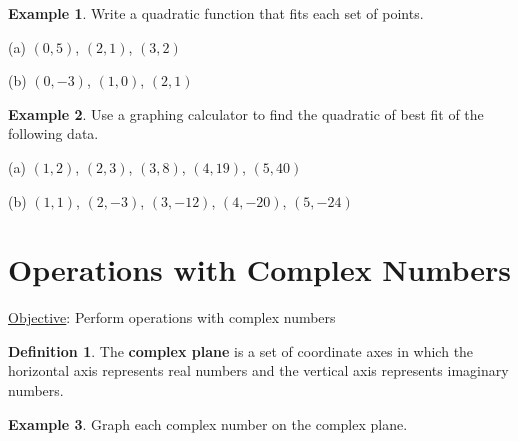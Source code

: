 \documentclass{report}
\theoremstyle{definition}
\newtheorem{example}{\bf Example}
\newtheorem{definition}{\bf Definition}[section]
\begin{document}
\begin{example}
Write a quadratic function that fits each set of points.
\end{example}

\begin{minipage}[t]{0.45\linewidth}
(a)  $(0,5)$, $(2,1)$, $(3,2)$


\end{minipage}
\hfill
\begin{minipage}[t]{0.45\linewidth}
(b) $(0,-3)$, $(1,0)$, $(2,1)$

\end{minipage}

\vfill

\begin{example}
Use a graphing calculator to find the quadratic of best fit of the following data.
\end{example}


\begin{minipage}[t]{0.45\linewidth}
(a)  $(1,2)$, $(2,3)$, $(3, 8)$, $(4,19)$, $(5, 40)$ 
\end{minipage}
\hfill
\begin{minipage}[t]{0.45\linewidth}
(b) $(1,1)$, $(2,-3)$, $(3,-12)$, $(4, -20)$, $(5,-24)$
\end{minipage}

\begin{minipage}[t]{0.45\linewidth}

\end{minipage}
\hfill
\begin{minipage}[t]{0.45\linewidth}

\end{minipage}

\vfill
\vfill
 \noindent{}
 \newpage

 \section{ Operations with Complex Numbers }
 \setcounter{example}{0}
 \setcounter{definition}{0}
 \hfill \underline{Objective}: Perform operations with complex numbers\\
 \begin{definition}
 The \textbf{complex plane} is a set of coordinate axes in which the horizontal axis represents real numbers and the vertical axis represents imaginary numbers.
 \end{definition}
 \begin{example}
 Graph each complex number on the complex plane. 
 \end{example}
 
\end{document}
